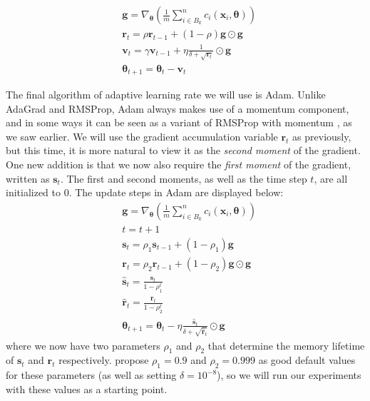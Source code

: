 \begin{align*}
    &\boldsymbol{g} = \nabla_{\boldsymbol{\theta}} \left ( \frac{1}{m} \sum_{i\in B_k}^n c_i (\boldsymbol{x}_i, \boldsymbol{\theta} ) \right )
    \\
    &\boldsymbol r_t = \rho \boldsymbol r_{t-1} + (1 -\rho)\boldsymbol{g} \odot \boldsymbol{g}
    \\
    &\boldsymbol v_t = \gamma \boldsymbol v_{t-1} + \eta \frac{1}{\delta + \sqrt{\boldsymbol r_t}} \odot \boldsymbol{g}
    \\
    &\boldsymbol{\theta}_{t+1} = \boldsymbol{\theta}_t - \boldsymbol v_t
\end{align*}

The final algorithm of adaptive learning rate we will use is Adam. Unlike AdaGrad and RMSProp, Adam always makes use of a momentum component, and in some ways it can be seen as a variant of RMSProp with momentum \cite{MHJweek39}, as we saw earlier. We will use the gradient accumulation variable $\boldsymbol r_t$ as previously, but this time, it is more natural to view it as the \emph{second moment} of the gradient. One new addition is that we now also require the \emph{first moment} of the gradient, written as $\boldsymbol s_t$. The first and second moments, as well as the time step $t$, are all initialized to 0. The update steps in Adam are displayed below:
\begin{align*}
    &\boldsymbol{g} = \nabla_{\boldsymbol{\theta}} \left ( \frac{1}{m} \sum_{i\in B_k}^n c_i (\boldsymbol{x}_i, \boldsymbol{\theta} ) \right )
    \\
    &t = t + 1
    \\
    &\boldsymbol s_t = \rho_1 \boldsymbol s_{t-1} + (1 -\rho_1)\boldsymbol{g}
    \\
    &\boldsymbol r_t = \rho_2 \boldsymbol r_{t-1} + (1 -\rho_2)\boldsymbol{g} \odot \boldsymbol{g}
    \\
    &\hat{\boldsymbol s}_t = \frac{\boldsymbol s_t}{1 - \rho_1^t}
    \\
    &\hat{\boldsymbol r}_t = \frac{\boldsymbol r_t}{1 - \rho_2^t}
    \\
    &\boldsymbol{\theta}_{t+1} = \boldsymbol{\theta}_t - \eta \frac{\hat{\boldsymbol s}_t}{\delta + \sqrt{\hat{\boldsymbol r}_t}} \odot \boldsymbol{g}
\end{align*}
where we now have two parameters $\rho_1$ and $\rho_2$ that determine the memory lifetime of $\boldsymbol s_t$ and $\boldsymbol r_t$ respectively. \textcite{Kingma2014AdamAM} propose $\rho_1 = 0.9$ and $\rho_2 = 0.999$ as good default values for these parameters (as well as setting $\delta = 10^{-8}$), so we will run our experiments with these values as a starting point. 

